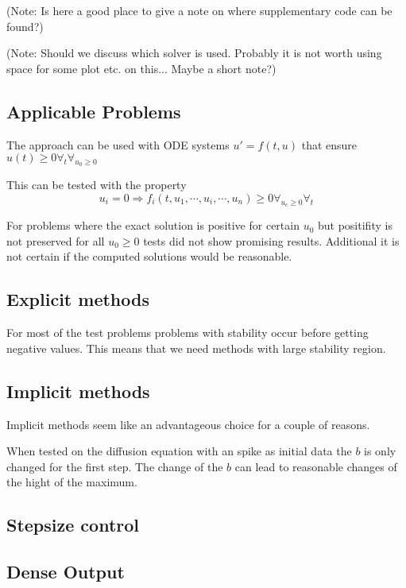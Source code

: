 \documentclass{article}
\begin{document}
(Note: Is here a good place to give a note on where supplementary code can be found?)

(Note: Should we discuss which solver is used. Probably it is not worth using space for some plot etc. on this... Maybe a short note?)

\subsection{Applicable Problems}\label{sec:app_problem}
The approach can be used with ODE systems $u' = f(t,u)$ that ensure  $u(t) \geq 0 \forall_t \forall_{  u_0 \geq 0}$ 

This can be tested with the property 
\begin{equation}
u_i=0 \Rightarrow f_i(t,u_1,\cdots,u_i,\cdots,u_n) \geq 0  \forall_{u_c \geq 0} \forall_{t}
\end{equation}

For problems where the exact solution is positive for certain $u_0$ but positifity is not preserved for all $u_0 \geq 0$ tests did not show promising results. Additional it is not certain if the computed solutions would be reasonable.


\subsection{Explicit methods}
For most of the test problems problems with stability occur before getting negative values. This means that we need methods with large stability region.



\subsection{Implicit methods}
Implicit methods seem like an advantageous choice for a couple of reasons.

When tested on the diffusion equation with an spike as initial data the $b$ is only changed for the first step. The change of the $b$ can lead to reasonable changes of the hight of the maximum. 

\subsection{Stepsize control}

\subsection{Dense Output}






\printbibliography
\end{document}
